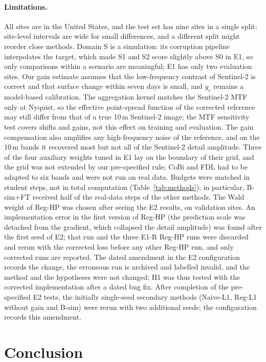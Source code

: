 \documentclass[pdflatex,sn-basic,referee,lineno]{sn-jnl}
\begin{document}
\paragraph{Limitations.} All sites are in the United States, and the test set has nine sites in a single split;
site-level intervals are wide for small differences, and a different split might reorder close methods. Domain S is
a simulation: its corruption pipeline interpolates the target, which made S1 and S2 score slightly above S0 in E1,
so only comparisons within a scenario are meaningful; E1 has only two evaluation sites. Our gain estimate assumes
that the low-frequency contrast of Sentinel-2 is correct and that surface change within seven days is small, and
$y_c$ remains a model-based calibration. The aggregation kernel matches the Sentinel-2 MTF only at Nyquist, so the
effective point-spread function of the corrected reference may still differ from that of a true 10\,m Sentinel-2
image; the MTF sensitivity test covers shifts and gains, not this effect on training and evaluation. The gain
compensation also amplifies any high-frequency noise of the reference, and on the 10\,m bands it recovered most but
not all of the Sentinel-2 detail amplitude. Three of the four auxiliary weights tuned in E1 lay on the boundary of
their grid, and the grid was not extended by our pre-specified rule; CoBi and FDL had to be adapted to six bands and
were not run on real data. Budgets were matched in student steps, not in total computation (Table~\ref{tab:methods}); in particular, B-sim+FT
received half of the real-data steps of the other methods. The Wald weight of
Reg-HP was chosen after seeing the E2 results, on validation sites. An implementation error in the first version
of Reg-HP (the prediction scale was detached from the gradient, which collapsed the detail amplitude) was found
after the first seed of E2; that run and the three E1-R Reg-HP runs were discarded and rerun with the corrected loss
before any other Reg-HP run, and only corrected runs are reported. The dated amendment in the E2 configuration
records the change, the erroneous run is archived and labelled invalid, and the method and the hypotheses were not
changed; H1 was thus tested with the corrected implementation after a dated bug fix. After completion of the pre-specified E2 tests, the initially
single-seed secondary methods (Naive-L1, Reg-L1 without gain and B-sim) were rerun with two additional seeds; the
configuration records this amendment.

\section{Conclusion}\label{sec:conclusion}
\end{document}
